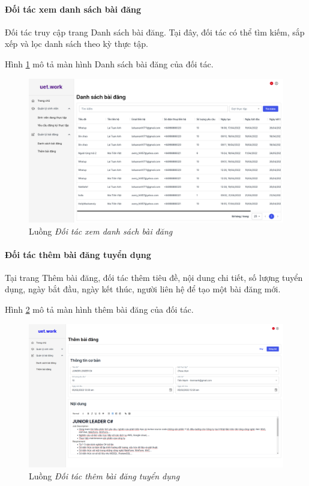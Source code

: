 \documentclass[./../main.tex]{subfiles}
\begin{document}
\paragraph*{Đối tác xem danh sách bài đăng}

Đối tác truy cập trang Danh sách bài đăng. Tại đây, đối tác có thể tìm kiếm, sắp xếp và lọc danh sách theo kỳ thực tập.

Hình \ref{fig:partner_list_post_page} mô tả màn hình Danh sách bài đăng của đối tác.

\begin{figure}[]
	\includegraphics[width=\linewidth]{./images/list_post.png}
	\caption{Luồng \emph{Đối tác xem danh sách bài đăng}}
	\label{fig:partner_list_post_page}
\end{figure}

\paragraph*{Đối tác thêm bài đăng tuyển dụng}

Tại trang Thêm bài đăng, đối tác thêm tiêu đề, nội dung chi tiết, số lượng tuyển dụng, ngày bắt đầu, ngày kết thúc, người liên hệ để tạo một bài đăng mới.

Hình \ref{fig:add_post_page} mô tả màn hình thêm bài đăng của đối tác.

\begin{figure}[]
	\includegraphics[width=\linewidth]{./images/image18.png}
	\caption{Luồng \emph{Đối tác thêm bài đăng tuyển dụng}}
	\label{fig:add_post_page}
\end{figure}
\end{document}
